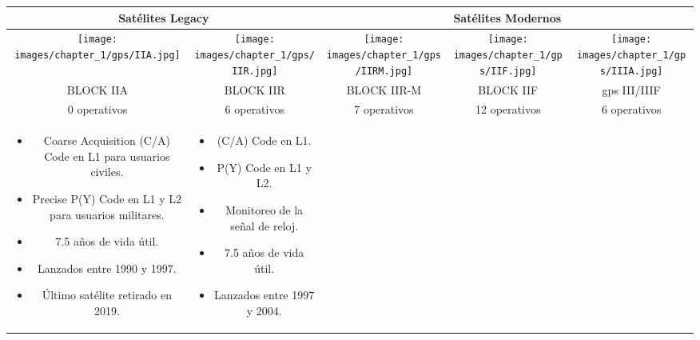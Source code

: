 \begin{table}[h!]
    \centering
    \renewcommand{\arraystretch}{1.5}
    \setlength{\tabcolsep}{5pt}
    \begin{tabular}{|c|c|c|c|c|}
        \hline
        \multicolumn{2}{|c|}{Satélites Legacy} &
        \multicolumn{3}{|c|}{Satélites Modernos} \\
        \hline
        \texttt{[image: images/chapter\_1/gps/IIA.jpg]} &
        \texttt{[image: images/chapter\_1/gps/IIR.jpg]} &
        \texttt{[image: images/chapter\_1/gps/IIRM.jpg]} &
        \texttt{[image: images/chapter\_1/gps/IIF.jpg]} &
        \texttt{[image: images/chapter\_1/gps/IIIA.jpg]} \\
        \hline
        BLOCK IIA & BLOCK IIR & BLOCK IIR-M & BLOCK IIF & \gls{gps} III/IIIF \\
        \hline
        \cellcolor{darkgray}0 operativos & \cellcolor{fluorescentgreen}6 operativos & \cellcolor{fluorescentgreen}7 operativos & \cellcolor{fluorescentgreen}12 operativos & \cellcolor{fluorescentgreen}6 operativos \\
        \hline
        \parbox[t]{2.5cm}{
            {\fontsize{9}{11}\selectfont
                \begin{itemize}[leftmargin=*]
                    \item Coarse Acquisition (C/A) Code en L1 para usuarios civiles.
                    \item Precise P(Y) Code en L1 y L2 para usuarios militares.
                    \item 7.5 años de vida útil.
                    \item Lanzados entre 1990 y 1997.
                    \item Último satélite retirado en 2019.
                \end{itemize}
            }
        } &
        \parbox[t]{2.5cm}{
            {\fontsize{9}{11}\selectfont
                \begin{itemize}[leftmargin=*]
                    \item (C/A) Code en L1.
                    \item P(Y) Code en L1 y L2.
                    \item Monitoreo de la señal de reloj.
                    \item 7.5 años de vida útil.
                    \item Lanzados entre 1997 y 2004.
                \end{itemize}
}}
\end{tabular}
\end{table}
